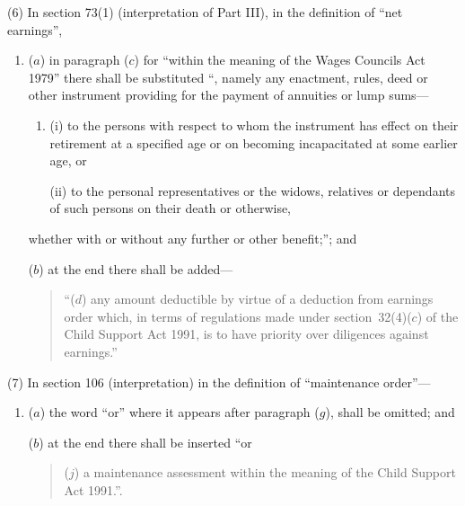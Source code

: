 \documentclass[12pt,a4paper]{article}
\begin{document}
(6) In section 73(1)  (interpretation of Part III), in the definition of “net earnings”,
\begin{enumerate}\item[]
($a$) in paragraph ($c$)  for “within the meaning of the Wages Councils Act 1979” there shall be substituted “, namely any enactment, rules, deed or other instrument providing for the payment of annuities or lump sums—
\begin{enumerate}\item[]
(i) to the persons with respect to whom the instrument has effect on their retirement at a specified age or on becoming incapacitated at some earlier age, or

(ii) to the personal representatives or the widows, relatives or dependants of such persons on their death or otherwise,
\end{enumerate}
whether with or without any further or other benefit;”; and

($b$) at the end there shall be added—
\begin{quotation}
“($d$) any amount deductible by virtue of a deduction from earnings order which, in terms of regulations made under section~32(4)($c$)  of the Child Support Act 1991, is to have priority over diligences against earnings.”
\end{quotation}
\end{enumerate}

(7) In section 106 (interpretation) in the definition of “maintenance order”—
\begin{enumerate}\item[]
($a$) the word “or” where it appears after paragraph ($g$), shall be omitted; and

($b$) at the end there shall be inserted “or
\begin{quotation}
($j$) a maintenance assessment within the meaning of the Child Support Act 1991.”.
\end{quotation}
\end{enumerate}
\end{document}
